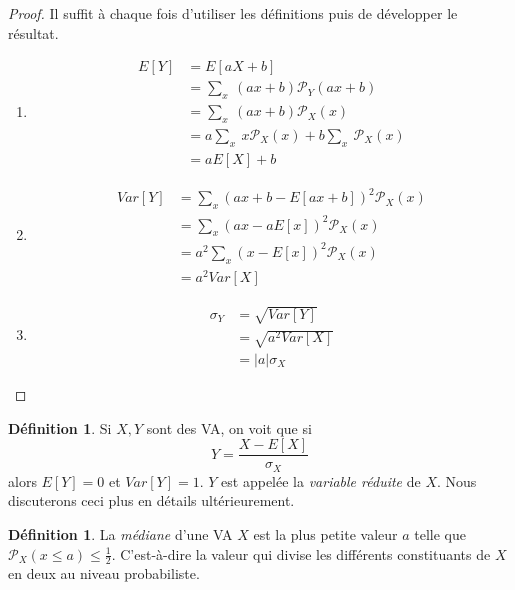 \documentclass[a4paper,12pt]{report}
\theoremstyle{definition}
\renewcommand{\(}{\left(}
\renewcommand{\)}{\right)}
\renewcommand{\P}{\mathcal{P}}
\renewcommand{\d}{\textit}
\newtheorem{defn}[thm]{Définition}
\begin{document}
            \begin{proof}Il suffit à chaque fois d'utiliser les définitions puis de développer le résultat.
                \begin{enumerate}[label=(\roman*)]
                    \item
                    \begin{align*}
                        E[Y] &= E[aX+b] \\
                        &= \sum_x~(ax+b)\P_Y(ax+b) \\
                        &= \sum_x~(ax+b)\P_X(x) \\
                        &= a\sum_x~x\P_X(x) + b\sum_x~\P_X(x) \\
                        &= aE[X] + b
                    \end{align*}
                    \item
                    \begin{align*}
                        Var[Y] &= \sum_x (ax+b-E[ax+b])^2\P_X(x) \\
                        &= \sum_x (ax-aE[x])^2\P_X(x) \\
                        &= a^2\sum_x (x-E[x])^2\P_X(x) \\
                        &= a^2Var[X]
                    \end{align*}
                    \item
                    \begin{align*}
                        \sigma_Y &= \sqrt{Var[Y]} \\
                        &= \sqrt{a^2Var[X]} \\
                        &= |a|\sigma_X
                    \end{align*}
                \end{enumerate}
            \end{proof}
            
            \begin{leftbar}
            \begin{defn}
                Si $X,Y$ sont des VA, on voit que si $$Y = \frac{X-E[X]}{\sigma_X}$$ alors $E[Y] = 0$ et $Var[Y] = 1$. $Y$ est appelée la \d{variable réduite} de $X$. Nous discuterons ceci plus en détails ultérieurement.
            \end{defn}
            \end{leftbar}
            
            \begin{leftbar}
                \begin{defn}
                    La \d{médiane} d'une VA $X$ est la plus petite  valeur $a$ telle que $\P_X(x\leq a)\leq\frac{1}{2}$. C'est-à-dire la valeur qui divise les différents constituants de $X$ en deux au niveau probabiliste.
                \end{defn}
            \end{leftbar}
            
\end{document}
